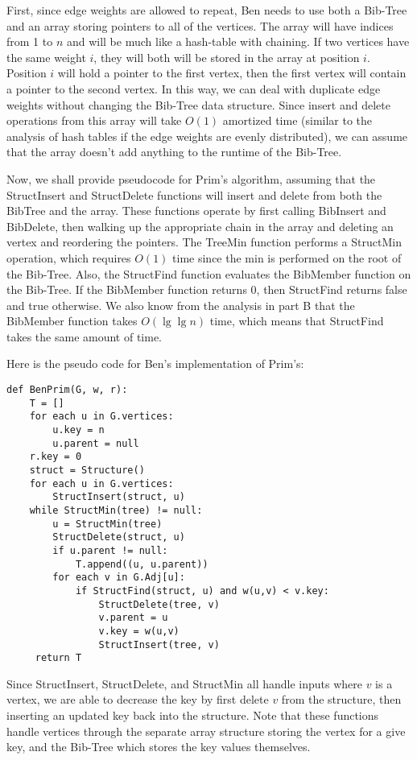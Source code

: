 \documentclass[psamsfonts]{amsart}
\newenvironment{sol}{{\bfseries Solution}}{\qedsymbol}
\theoremstyle{definition}
\theoremstyle{remark}
\numberwithin{equation}{section}
\begin{document}
\begin{sol}
First, since edge weights are allowed to repeat, Ben needs to use both a Bib-Tree and an array storing pointers to all of the vertices. The array will have indices from 1 to $n$ and will be much like a hash-table with chaining. If two vertices have the same weight $i$, they will both will be stored in the array at position $i$. Position $i$ will hold a pointer to the first vertex, then the first vertex will contain a pointer to the second vertex. In this way, we can deal with duplicate edge weights without changing the Bib-Tree data structure. Since insert and delete operations from this array will take $O(1)$ amortized time (similar to the analysis of hash tables if the edge weights are evenly distributed), we can assume that the array doesn't add anything to the runtime of the Bib-Tree.

Now, we shall provide pseudocode for Prim's algorithm, assuming that the StructInsert and StructDelete functions will insert and delete from both the BibTree and the array. These functions operate by first calling BibInsert and BibDelete, then walking up the appropriate chain in the array and deleting an vertex and reordering the pointers. The TreeMin function performs a StructMin operation, which requires $O(1)$ time since the min is performed on the root of the Bib-Tree. Also, the StructFind function evaluates the BibMember function on the Bib-Tree. If the BibMember function returns 0, then StructFind returns false and true otherwise. We also know from the analysis in part B that the BibMember function takes $O(\lg \lg n)$ time, which means that StructFind takes the same amount of time. 

Here is the pseudo code for Ben's implementation of Prim's:
\begin{verbatim}
def BenPrim(G, w, r):
    T = []
    for each u in G.vertices:
        u.key = n
        u.parent = null
    r.key = 0
    struct = Structure()
    for each u in G.vertices:
        StructInsert(struct, u)
    while StructMin(tree) != null:
        u = StructMin(tree)
        StructDelete(struct, u)
        if u.parent != null:
            T.append((u, u.parent)) 
        for each v in G.Adj[u]:
            if StructFind(struct, u) and w(u,v) < v.key:
                StructDelete(tree, v)
                v.parent = u
                v.key = w(u,v)
                StructInsert(tree, v)
     return T
\end{verbatim}

Since StructInsert, StructDelete, and StructMin all handle inputs where $v$ is a vertex, we are able to decrease the key by first delete $v$ from the structure, then inserting an updated key back into the structure. Note that these functions handle vertices through the separate array structure storing the vertex for a give key, and the Bib-Tree which stores the key values themselves. 


\end{sol}
\end{document}
